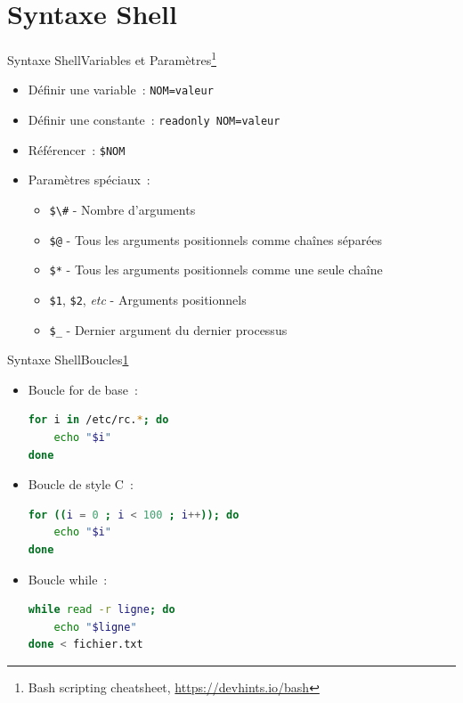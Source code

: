 \documentclass{beamer}
\begin{document}
    \section{Syntaxe Shell}\label{sec:syntaxe-shell}

    \begin{frame}{Syntaxe Shell}{Variables et Paramètres\footnote{\label{devhint-bash}Bash scripting cheatsheet, \url{https://devhints.io/bash}}}
        \bigbreak
        \begin{itemize}
            \item Définir une variable~: \lstinline{NOM=valeur}
            \item Définir une constante~: \lstinline{readonly NOM=valeur}
            \item Référencer~: \lstinline{$NOM}
            \item Paramètres spéciaux~:
            \begin{itemize}
                \item \lstinline{$\#} - Nombre d'arguments
                \item \lstinline{$@} - Tous les arguments positionnels comme chaînes séparées
                \item \lstinline{$*} - Tous les arguments positionnels comme une seule chaîne
                \item \lstinline{$1}, \lstinline{$2}, \textit{etc} - Arguments positionnels
                \item \lstinline{$_} - Dernier argument du dernier processus
            \end{itemize}
        \end{itemize}
    \end{frame}

    \begin{frame}[fragile]{Syntaxe Shell}{Boucles\cref{devhint-bash}}
        \begin{itemize}
            \item Boucle for de base~:
            \begin{lstlisting}[language=bash]
for i in /etc/rc.*; do
    echo "$i"
done
            \end{lstlisting}
            \item Boucle de style C~:
            \begin{lstlisting}[language=bash]
for ((i = 0 ; i < 100 ; i++)); do
    echo "$i"
done
            \end{lstlisting}
            \item Boucle while~:
            \begin{lstlisting}[language=bash]
while read -r ligne; do
    echo "$ligne"
done < fichier.txt
            \end{lstlisting}
        \end{itemize}
    \end{frame}
\end{document}
